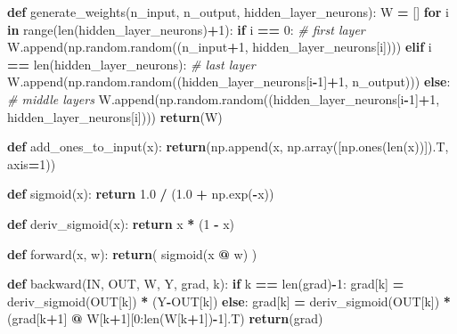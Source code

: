 \documentclass[
]{book}
\newenvironment{Shaded}{\begin{snugshade}}{\end{snugshade}}
\newcommand{\BuiltInTok}[1]{#1}
\newcommand{\CommentTok}[1]{\textcolor[rgb]{0.56,0.35,0.01}{\textit{#1}}}
\newcommand{\ControlFlowTok}[1]{\textcolor[rgb]{0.13,0.29,0.53}{\textbf{#1}}}
\newcommand{\DecValTok}[1]{\textcolor[rgb]{0.00,0.00,0.81}{#1}}
\newcommand{\FloatTok}[1]{\textcolor[rgb]{0.00,0.00,0.81}{#1}}
\newcommand{\KeywordTok}[1]{\textcolor[rgb]{0.13,0.29,0.53}{\textbf{#1}}}
\newcommand{\NormalTok}[1]{#1}
\newcommand{\OperatorTok}[1]{\textcolor[rgb]{0.81,0.36,0.00}{\textbf{#1}}}
\begin{document}
\begin{Shaded}
\begin{Highlighting}[]
\KeywordTok{def}\NormalTok{ generate\_weights(n\_input, n\_output, hidden\_layer\_neurons):}
\NormalTok{  W }\OperatorTok{=}\NormalTok{ []}
  \ControlFlowTok{for}\NormalTok{ i }\KeywordTok{in} \BuiltInTok{range}\NormalTok{(}\BuiltInTok{len}\NormalTok{(hidden\_layer\_neurons)}\OperatorTok{+}\DecValTok{1}\NormalTok{):}
    \ControlFlowTok{if}\NormalTok{ i }\OperatorTok{==} \DecValTok{0}\NormalTok{: }\CommentTok{\# first layer}
\NormalTok{      W.append(np.random.random((n\_input}\OperatorTok{+}\DecValTok{1}\NormalTok{, hidden\_layer\_neurons[i])))}
    \ControlFlowTok{elif}\NormalTok{ i }\OperatorTok{==} \BuiltInTok{len}\NormalTok{(hidden\_layer\_neurons): }\CommentTok{\# last layer}
\NormalTok{      W.append(np.random.random((hidden\_layer\_neurons[i}\OperatorTok{{-}}\DecValTok{1}\NormalTok{]}\OperatorTok{+}\DecValTok{1}\NormalTok{, n\_output)))}
    \ControlFlowTok{else}\NormalTok{: }\CommentTok{\# middle layers}
\NormalTok{      W.append(np.random.random((hidden\_layer\_neurons[i}\OperatorTok{{-}}\DecValTok{1}\NormalTok{]}\OperatorTok{+}\DecValTok{1}\NormalTok{, hidden\_layer\_neurons[i])))}
  \ControlFlowTok{return}\NormalTok{(W)}

\KeywordTok{def}\NormalTok{ add\_ones\_to\_input(x):}
  \ControlFlowTok{return}\NormalTok{(np.append(x, np.array([np.ones(}\BuiltInTok{len}\NormalTok{(x))]).T, axis}\OperatorTok{=}\DecValTok{1}\NormalTok{))}



\KeywordTok{def}\NormalTok{ sigmoid(x):}
  \ControlFlowTok{return} \FloatTok{1.0} \OperatorTok{/}\NormalTok{ (}\FloatTok{1.0} \OperatorTok{+}\NormalTok{ np.exp(}\OperatorTok{{-}}\NormalTok{x))}

\KeywordTok{def}\NormalTok{ deriv\_sigmoid(x):}
  \ControlFlowTok{return}\NormalTok{ x }\OperatorTok{*}\NormalTok{ (}\DecValTok{1} \OperatorTok{{-}}\NormalTok{ x)}


\KeywordTok{def}\NormalTok{ forward(x, w):}
  \ControlFlowTok{return}\NormalTok{( sigmoid(x }\OperatorTok{@}\NormalTok{ w) )}

\KeywordTok{def}\NormalTok{ backward(IN, OUT, W, Y, grad, k):}
  \ControlFlowTok{if}\NormalTok{ k }\OperatorTok{==} \BuiltInTok{len}\NormalTok{(grad)}\OperatorTok{{-}}\DecValTok{1}\NormalTok{:}
\NormalTok{    grad[k] }\OperatorTok{=}\NormalTok{ deriv\_sigmoid(OUT[k]) }\OperatorTok{*}\NormalTok{ (Y}\OperatorTok{{-}}\NormalTok{OUT[k])}
  \ControlFlowTok{else}\NormalTok{:}
\NormalTok{    grad[k] }\OperatorTok{=}\NormalTok{ deriv\_sigmoid(OUT[k]) }\OperatorTok{*}\NormalTok{(grad[k}\OperatorTok{+}\DecValTok{1}\NormalTok{] }\OperatorTok{@}\NormalTok{ W[k}\OperatorTok{+}\DecValTok{1}\NormalTok{][}\DecValTok{0}\NormalTok{:}\BuiltInTok{len}\NormalTok{(W[k}\OperatorTok{+}\DecValTok{1}\NormalTok{])}\OperatorTok{{-}}\DecValTok{1}\NormalTok{].T)}
  \ControlFlowTok{return}\NormalTok{(grad)}
\end{Highlighting}
\end{Shaded}
\end{document}
